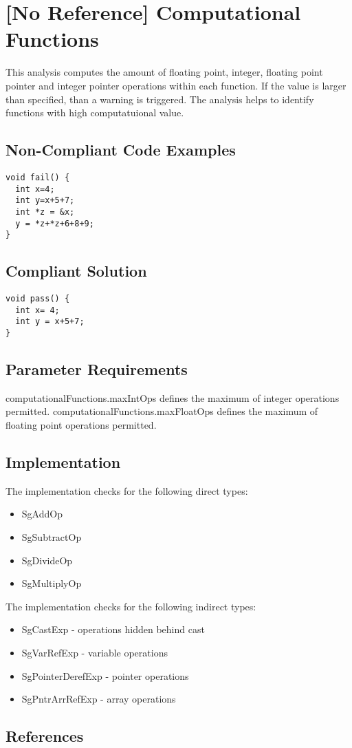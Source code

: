 \section{[No Reference] Computational Functions}

This analysis computes the amount of floating point, integer, floating point pointer and
integer pointer operations within each function. If the value is larger than
specified, than a warning is triggered. The analysis helps to identify functions
with high computatuional value.


\subsection{Non-Compliant Code Examples}
\begin{verbatim}
void fail() {
  int x=4;
  int y=x+5+7;
  int *z = &x;
  y = *z+*z+6+8+9;
}
\end{verbatim}

\subsection{Compliant Solution}
\begin{verbatim}
void pass() {
  int x= 4;
  int y = x+5+7;
}
\end{verbatim}



\subsection{Parameter Requirements}

computationalFunctions.maxIntOps defines the maximum of integer operations permitted.
computationalFunctions.maxFloatOps defines the maximum of floating point operations permitted.


\subsection{Implementation}

The implementation checks for the following direct types:
\begin{itemize}
\item SgAddOp
\item SgSubtractOp
\item SgDivideOp
\item SgMultiplyOp
\end{itemize}

The implementation checks for the following indirect types:
\begin{itemize}
\item SgCastExp - operations hidden behind cast
\item SgVarRefExp - variable operations
\item SgPointerDerefExp - pointer operations
\item SgPntrArrRefExp - array operations
\end{itemize}

\subsection{References}

